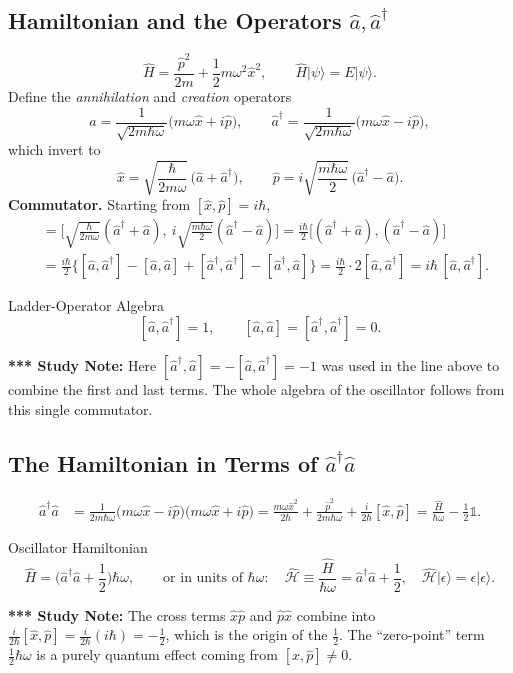 \documentclass[11pt,a4paper]{article}
\begin{document}
\subsection{Hamiltonian and the Operators \texorpdfstring{$\hat a,\hat a^\dagger$}{a and a-dagger}}
\[
\hat H=\frac{\hat p^2}{2m}+\frac12m\omega^2\hat x^2,\qquad \hat H|\psi\rangle=E|\psi\rangle .
\]
Define the \emph{annihilation} and \emph{creation} operators
\[
\hat a=\frac1{\sqrt{2m\hbar\omega}}\big(m\omega\hat x+i\hat p\big),\qquad
\hat a^\dagger=\frac1{\sqrt{2m\hbar\omega}}\big(m\omega\hat x-i\hat p\big),
\]
which invert to
\[
\hat x=\sqrt{\frac\hbar{2m\omega}}\,\big(\hat a+\hat a^\dagger\big),\qquad
\hat p=i\sqrt{\frac{m\hbar\omega}2}\,\big(\hat a^\dagger-\hat a\big).
\]
\textbf{Commutator.} Starting from $[\hat x,\hat p]=i\hbar$,
\begin{align*}
[\hat x,\hat p]&=\Big[\sqrt{\tfrac\hbar{2m\omega}}(\hat a^\dagger+\hat a),\ i\sqrt{\tfrac{m\hbar\omega}2}(\hat a^\dagger-\hat a)\Big]
=\frac{i\hbar}2\big[(\hat a^\dagger+\hat a),(\hat a^\dagger-\hat a)\big]\\
&=\frac{i\hbar}2\Big\{[\hat a,\hat a^\dagger]-[\hat a,\hat a]+[\hat a^\dagger,\hat a^\dagger]-[\hat a^\dagger,\hat a]\Big\}
=\frac{i\hbar}2\cdot2[\hat a,\hat a^\dagger]=i\hbar\,[\hat a,\hat a^\dagger].
\end{align*}
\begin{thm}{Ladder-Operator Algebra}
\[
[\hat a,\hat a^\dagger]=1,\qquad [\hat a,\hat a]=[\hat a^\dagger,\hat a^\dagger]=0 .
\]
\end{thm}
\textbf{*** Study Note:} Here $[\hat a^\dagger,\hat a]=-[\hat a,\hat a^\dagger]=-1$ was used in the line above to combine the first and last terms. The whole algebra of the oscillator follows from this single commutator.

\subsection{The Hamiltonian in Terms of \texorpdfstring{$\hat a^\dagger\hat a$}{a-dagger a}}
\begin{align*}
\hat a^\dagger\hat a&=\frac1{2m\hbar\omega}\big(m\omega\hat x-i\hat p\big)\big(m\omega\hat x+i\hat p\big)
=\frac{m\omega\hat x^2}{2\hbar}+\frac{\hat p^2}{2m\hbar\omega}+\frac i{2\hbar}[\hat x,\hat p]
=\frac{\hat H}{\hbar\omega}-\frac12\mathbb 1 .
\end{align*}
\begin{thm}{Oscillator Hamiltonian}
\[
\hat H=\Big(\hat a^\dagger\hat a+\frac12\Big)\hbar\omega,\qquad\text{or in units of }\hbar\omega:\quad
\hat{\mathcal H}\equiv\frac{\hat H}{\hbar\omega}=\hat a^\dagger\hat a+\frac12,\quad \hat{\mathcal H}|\epsilon\rangle=\epsilon|\epsilon\rangle .
\]
\end{thm}
\textbf{*** Study Note:} The cross terms $\hat x\hat p$ and $\hat p\hat x$ combine into $\frac i{2\hbar}[\hat x,\hat p]=\frac i{2\hbar}(i\hbar)=-\frac12$, which is the origin of the $\frac12$. The ``zero-point'' term $\frac12\hbar\omega$ is a purely quantum effect coming from $[\hat x,\hat p]\neq0$.
\end{document}
